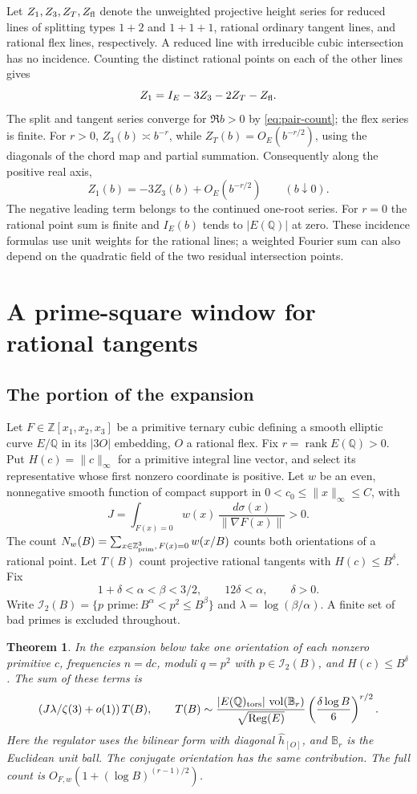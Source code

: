 \documentclass[11pt]{article}
\begin{document}
Let $Z_1,Z_3,Z_T,Z_{\rm fl}$ denote the unweighted projective
height series for reduced lines of splitting types $1+2$ and $1+1+1$,
rational ordinary tangent lines, and rational flex lines, respectively.
A reduced line with irreducible cubic intersection has no incidence.
Counting the distinct rational points on each of the other lines gives
\[
                       Z_1=I_E-3Z_3-2Z_T-Z_{\rm fl}.
\]
The split and tangent series converge for $\Re b>0$ by
\eqref{eq:pair-count}; the flex series is finite. For $r>0$,
$Z_3(b)\asymp b^{-r}$, while $Z_T(b)=O_E(b^{-r/2})$, using the
diagonals of the chord map and partial summation. Consequently along
the positive real axis,
\[
                   Z_1(b)=-3Z_3(b)+O_E(b^{-r/2})\qquad(b\downarrow0).
\]
The negative leading term belongs to the continued one-root series.
For $r=0$ the rational point sum is finite and $I_E(b)$ tends to
$|E(\mathbb Q)|$ at zero. These incidence formulas use unit weights
for the rational lines; a weighted Fourier sum can also depend on
the quadratic field of the two residual intersection points.

\section{A prime-square window for rational tangents}
\label{app:prime-square-tangent-window}
\newtheorem{psqtheorem}{Theorem}[section]
\subsection{The portion of the expansion}
Let $F\in\mathbb Z[x_1,x_2,x_3]$ be a primitive ternary cubic defining a smooth elliptic curve $E/\mathbb Q$ in its $|3O|$ embedding, $O$ a rational flex. Fix $r=\operatorname{rank}E(\mathbb Q)>0$. Put $H(c)=\|c\|_\infty$ for a primitive integral line vector, and select its representative whose first nonzero coordinate is positive. Let $w$ be an even, nonnegative smooth function of compact support in $0<c_0\le\|x\|_\infty\le C$, with
\[
 J=\int_{F(x)=0}w(x)\,\frac{d\sigma(x)}{\|\nabla F(x)\|}>0.
\]
The count $N_w(B)=\sum_{x\in\mathbb Z^3_{\rm prim},\,F(x)=0}w(x/B)$ counts both orientations of a rational point. Let $T(B)$ count projective rational tangents with $H(c)\le B^\delta$. Fix
\[
 1+\delta<\alpha<\beta<3/2,\qquad 12\delta<\alpha,\qquad \delta>0 .
\]
Write $\mathcal I_2(B)=\{p\text{ prime}:B^\alpha<p^2\le B^\beta\}$ and $\lambda=\log(\beta/\alpha)$. A finite set of bad primes is excluded throughout.

\begin{psqtheorem}\label{th:prime-square-sector}
In the expansion below take one orientation of each nonzero primitive $c$, frequencies $n=dc$, moduli $q=p^2$ with $p\in\mathcal I_2(B)$, and $H(c)\le B^\delta$. The sum of these terms is
\[
 (J\lambda/\zeta(3)+o(1))\,T(B),\qquad
 T(B)\sim\frac{|E(\mathbb Q)_{\rm tors}|\,\operatorname{vol}(\mathbb B_r)}
                 {\sqrt{\operatorname{Reg}(E)}}\left(\frac{\delta\log B}{6}\right)^{r/2}.
\]
Here the regulator uses the bilinear form with diagonal $\widehat h_{[O]}$, and $\mathbb B_r$ is the Euclidean unit ball. The conjugate orientation has the same contribution. The full count is $O_{F,w}(1+(\log B)^{(r-1)/2})$.
\end{psqtheorem}
\end{document}
